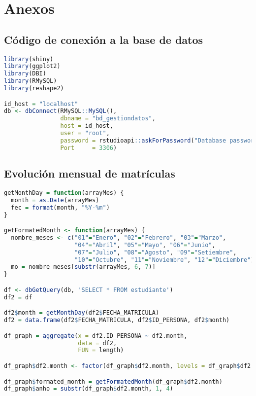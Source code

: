\chapter{Anexos}
\label{Anexos} %

 \section{Código de conexión a la base de datos}\label{codigo_conexionbd}
\begin{lstlisting}[language=R]
library(shiny)
library(ggplot2)
library(DBI)
library(RMySQL)
library(reshape2)

id_host = "localhost"
db <- dbConnect(RMySQL::MySQL(),
                dbname = "bd_gestiondatos",
                host = id_host,
                user = "root",
                password = rstudioapi::askForPassword("Database password"),
                Port     = 3306)
\end{lstlisting}

\section{Evolución mensual de matrículas}\label{evolucion_matriculas}
\begin{lstlisting}[language=R]
getMonthDay = function(arrayMes) {
  month = as.Date(arrayMes)
  fec = format(month, "%Y-%m")
}

getFormatedMonth <- function(arrayMes) {
  nombre_meses <- c("01"="Enero", "02"="Febrero", "03"="Marzo",
                    "04"="Abril", "05"="Mayo", "06"="Junio",
                    "07"="Julio", "08"="Agosto", "09"="Setiembre",
                    "10"="Octubre", "11"="Noviembre", "12"="Diciembre")
  mo = nombre_meses[substr(arrayMes, 6, 7)]
}

df <- dbGetQuery(db, 'SELECT * FROM estudiante')
df2 = df

df2$month = getMonthDay(df2$FECHA_MATRICULA)
df2 = data.frame(df2$FECHA_MATRICULA, df2$ID_PERSONA, df2$month)

df_graph = aggregate(x = df2.ID_PERSONA ~ df2.month, 
                     data = df2, 
                     FUN = length)

df_graph$df2.month <- factor(df_graph$df2.month, levels = df_graph$df2.month, ordered=T)

df_graph$formated_month = getFormatedMonth(df_graph$df2.month)
df_graph$anho = substr(df_graph$df2.month, 1, 4)


\end{lstlisting}